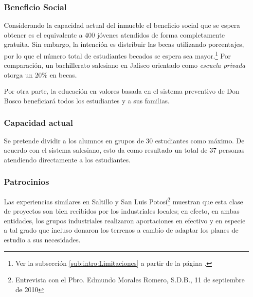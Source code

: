 
\subsubsection{Beneficio Social}
\label{sub:sub:Beneficio:Social}

Considerando la capacidad actual del inmueble el beneficio social que se espera obtener es el equivalente a 400 jóvenes atendidos de forma completamente gratuita. Sin embargo, la intención es distribuir las becas utilizando porcentajes, por lo que el número total de estudiantes becados se espera sea mayor.\footnote{Ver la subsección \ref{sub:intro:Limitaciones} a partir de la página \pageref{sub:intro:Limitaciones}.} Por comparación, un bachillerato salesiano en Jalisco orientado como \emph{escuela privada} otorga un 20\% en becas.

Por otra parte, la educación en valores basada en el sistema preventivo de Don Bosco beneficiará todos los estudiantes y a sus familias.

\subsubsection{Capacidad actual}

Se pretende dividir a los alumnos en grupos de 30 estudiantes como máximo. De acuerdo con el sistema salesiano, esto da como resultado un total de 37 personas atendiendo directamente a los estudiantes.


\subsubsection{Patrocinios}
\label{sub:Patrocinios}

Las experiencias similares en Saltillo y San Luis Potosí\footnote{Entrevista con el Pbro. Edmundo Morales Romero, S.D.B., 11 de septiembre de 2010} muestran que esta clase de proyectos son bien recibidos por los industriales locales; en efecto, en ambas entidades, los grupos industriales realizaron aportaciones en efectivo y en especie a tal grado que incluso donaron los terrenos a cambio de adaptar los planes de estudio a sus necesidades.

